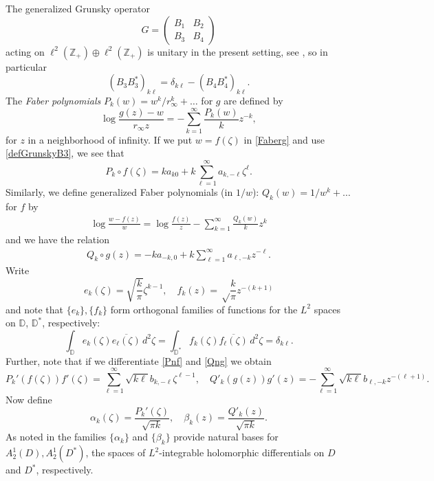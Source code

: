 \documentclass{article}
\numberwithin{equation}{section}
\numberwithin{figure}{section}
\theoremstyle{plain}
\theoremstyle{plain}
\numberwithin{thm}{section}
\theoremstyle{remark}
\newcommand{\D}{\mathbb{D}}
\begin{document}
The generalized Grunsky operator \[G= \begin{pmatrix}
B_1 & B_2 \\
B_3 & B_4
\end{pmatrix}\] acting on $\ell^2(\mathbb{Z}_+) \oplus \ell^2(\mathbb{Z}_+)$ is unitary in the present setting, see \cite{TT}, so in particular
\begin{equation}\label{B3B4}
(B_3B_3^*)_{k\ell}=\delta_{k\ell}-(B_4B_4^*)_{k\ell}.
\end{equation}
The \emph{Faber polynomials} $P_k(w)=w^k/r_\infty^k+\dots$ for $g$ are defined by
\begin{equation}\label{Faberg}
\log\frac{g(z)-w}{r_\infty z}=-\sum_{k=1}^\infty\frac{P_k(w)}kz^{-k},
\end{equation}
for $z$ in a neighborhood of infinity. 
If we put $w=f(\zeta)$ in \eqref{Faberg} and use \eqref{defGrunskyB3}, we see that
\begin{equation}\label{Pnf}
P_k \circ f(\zeta)=ka_{k0}+k\sum_{\ell=1}^\infty a_{k,-\ell}\zeta^\ell.
\end{equation}
Similarly, we define generalized Faber polynomials (in $1/w$): $Q_k(w) = 1/w^k + \ldots$ for $f$ by
\begin{align}\label{Faberf}
\log \frac{w-f(z)}{w} = \log \frac{f(z)}{z} - \sum_{k=1}^\infty \frac{Q_k(w)}{k} z^k
\end{align}
and we have the relation
\begin{align}\label{Qng}
Q_k \circ g(z) = -k a_{-k,0} + k \sum_{\ell = 1}^\infty a_{\ell,-k} z^{-\ell}.
\end{align}
Write
\begin{equation}\label{ek}
e_k(\zeta)=\sqrt{\frac k{\pi}}\zeta^{k-1}, \quad f_k(z) = \sqrt \frac{k}{\pi}z^{-(k+1)}
\end{equation}
and note that $\{e_k\}, \{f_k\} $ form orthogonal families of functions for the $L^2$ spaces on $\D$, $\D^*$, respectively:
\begin{equation}\label{ekorth}
\int_{\D}e_k(\zeta)\overline{e_\ell(\zeta)}\,d^2\zeta=\int_{\D^*}f_k(\zeta)\overline{f_\ell(\zeta)}\,d^2\zeta=\delta_{k\ell}.
\end{equation}
Further, note that if we differentiate \eqref{Pnf} and \eqref{Qng} we obtain
\begin{equation}\label{Pnprime}
P_k'(f(\zeta))f'(\zeta)=\sum_{\ell=1}^\infty \sqrt{k\ell} b_{k,-\ell}\zeta^{\ell-1}, \quad Q'_k(g(z))g'(z) = -\sum_{\ell = 1}^\infty
\sqrt{k\ell} b_{\ell, -k} z^{-(\ell+1)}.\end{equation}
Now define
\begin{equation*}
\alpha_k(\zeta)=\frac{P_k'(\zeta)}{\sqrt{\pi k}}, \quad \beta_k(z)= \frac{Q'_k(z)}{\sqrt{\pi k}}.
\end{equation*}
As noted in \cite{TT} the families $\{\alpha_k\}$ and $\{\beta_k\}$ provide natural bases for $A_2^1(D), A_2^1(D^*)$, the spaces of $L^2$-integrable holomorphic differentials on $D$ and $D^*$, respectively.
\end{document}
